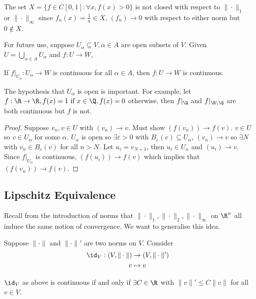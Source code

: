 \documentclass[a4paper]{article}
\theoremstyle{definition}
\begin{document}
\begin{eg}
  The set \(X=\{f\in C[0,1]: \forall x, f(x)>0\}\) is not closed with respect to \(\|\cdot\|_1\) or \(\|\cdot\|_\infty\) since \(f_n(x) = \frac{1}{n} \in X\), \((f_n) \to 0\) with respect to either norm but \(0 \notin X\).
\end{eg}

For future use, suppose \(U_\alpha \subseteq V, \alpha\in A\) are open subsets of \(V\). Given \(U = \bigcup_{\alpha\in A}U_\alpha\) and \(f: U \to W\),

\begin{proposition}
  If \(f|_{U_\alpha}:U_\alpha \to W\) is continuous for all \(\alpha \in A\), then \(f: U \to W\) is continuous.
\end{proposition}

\begin{note}
  The hypothesis that \(U_\alpha\) is open is important. For example, let \(f:\R\to\R, f(x) = 1 \text{ if } x\in\Q, f(x)=0\) otherwise, then \(f|_\Q\) and \(f|_{\R\setminus\Q}\) are both continuous but \(f\) is not.
\end{note}

\begin{proof}
  Suppose \(v_n, v\in U\) with \((v_n)\to v\). Must show \((f(v_n))\to f(v)\). \(v\in U\) so \(v\in U_\alpha\) for some \(\alpha\). \(U_\alpha\) is open so \(\exists \varepsilon >0\) with \(B_\varepsilon(v) \subseteq U_\alpha\), \((v_n)\to v\) so \(\exists N\) with \(v_n \in B_\varepsilon(v)\) for all \(n>N\). Let \(u_i=v_{N+1}\), then \(u_i\in U_\alpha\) and \((u_i)\to v\). Since \(f|_{U_\alpha}\) is continuous, \((f(u_i))\to f(v)\) which implies that \((f(v_n)) \to f(v)\).
\end{proof}

\subsection{Lipschitz Equivalence}

Recall from the introduction of norms that \(\|\cdot\|_1, \|\cdot\|_2, \|\cdot\|_\infty\) on \(\R^n\) all induce the same notion of convergence. We want to generalise this idea.

Suppose \(\|\cdot\|\) and \(\|\cdot\|'\) are two norms on \(V\). Consider
\begin{align*}
  \id_V:(V,\|\cdot\|) &\to (V,\|\cdot\|') \\
  v &\mapsto v
\end{align*}

\begin{proposition}
  \label{prop:continuity of id}
  \(\id_V\) as above is continuous if and only if \(\exists C \in \R\) with \(\|v\|' \leq C \|v\|\) for all \(v \in V\).
\end{proposition}
\end{document}
